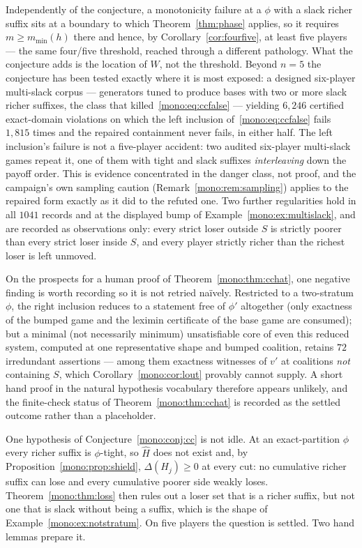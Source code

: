 \documentclass[11pt]{article}
\begin{document}
Independently of the conjecture, a monotonicity failure at a $\phi$ with a
slack richer suffix sits at a boundary to which Theorem~\ref{thm:phase}
applies, so it requires $m\ge m_{\min}(h)$ there and hence, by
Corollary~\ref{cor:fourfive}, at least five players --- the same four/five
threshold, reached through a different pathology.  What the conjecture adds
is the location of $W$, not the threshold.  Beyond $n=5$ the conjecture has
been tested exactly where it is most exposed: a designed six-player
multi-slack corpus --- generators tuned to produce bases with two or more
slack richer suffixes, the class that killed~\eqref{mono:eq:ccfalse} ---
yielding $6{,}246$ certified exact-domain violations on which the
left inclusion of~\eqref{mono:eq:ccfalse} fails $1{,}815$ times
and the repaired containment never fails, in either half.  The left
inclusion's failure is not a five-player accident: two audited six-player
multi-slack games repeat it, one of them with tight and slack suffixes
\emph{interleaving} down the payoff order.  This is evidence concentrated
in the danger class, not proof, and the campaign's own sampling caution
(Remark~\ref{mono:rem:sampling}) applies to the repaired form exactly as it
did to the refuted one.  Two further regularities hold in
all $1041$ records and at the displayed bump of
Example~\ref{mono:ex:multislack}, and are recorded as observations only:
every strict loser outside $S$ is strictly poorer than every strict loser
inside $S$, and every player strictly richer than the richest loser is left
unmoved.

On the prospects for a human proof of Theorem~\ref{mono:thm:cchat}, one
negative finding is worth recording so it is not retried na\"ively.
Restricted to a two-stratum $\phi$, the right inclusion reduces to a
statement free of $\phi'$ altogether (only exactness of the bumped game and
the leximin certificate of the base game are consumed); but a minimal (not
necessarily minimum) unsatisfiable core of even this reduced system,
computed at one representative shape and bumped coalition, retains $72$
irredundant assertions --- among them exactness witnesses of $v'$ at
coalitions
\emph{not} containing $S$, which Corollary~\ref{mono:cor:lout} provably
cannot supply.  A short hand proof in the natural hypothesis vocabulary
therefore appears unlikely, and the finite-check status of
Theorem~\ref{mono:thm:cchat} is recorded as the settled outcome rather than
a placeholder.

One hypothesis of Conjecture~\ref{mono:conj:cc} is not idle.  At an
exact-partition $\phi$ every richer suffix is $\phi$-tight, so $\widehat H$
does not exist and, by Proposition~\ref{mono:prop:shield},
$\Delta(H_j)\ge0$ at every cut: no cumulative richer suffix can lose and
every cumulative poorer side weakly loses.  Theorem~\ref{mono:thm:loss}
then rules out a loser set that is a richer suffix, but not one that is
slack without being a suffix, which is the shape of
Example~\ref{mono:ex:notstratum}.  On five players the question is settled.
Two hand lemmas prepare it.
\end{document}
